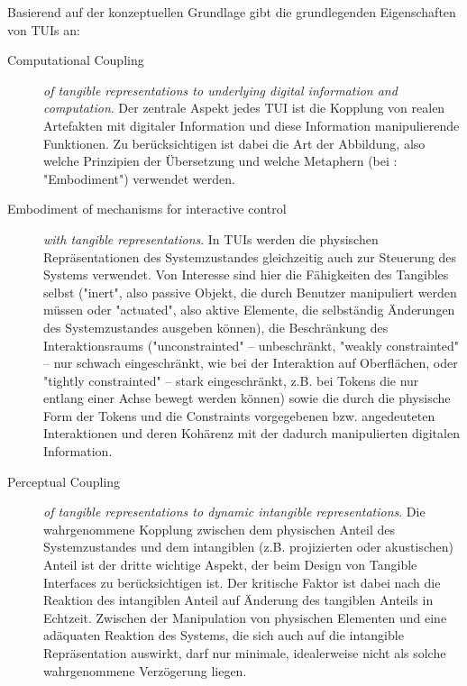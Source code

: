 Basierend auf der konzeptuellen Grundlage gibt \citeauthor{Ishii08} die grundlegenden Eigenschaften von \glspl{TUI} an:
\begin{description}
	\item[Computational Coupling] \emph{of tangible representations to underlying digital information and computation}. Der zentrale Aspekt jedes \gls{TUI} ist die Kopplung von realen Artefakten mit digitaler Information und diese Information manipulierende Funktionen. Zu berücksichtigen ist dabei die Art der Abbildung, also welche Prinzipien der Übersetzung und welche Metaphern (bei \citeauthor{Ishii08}: "Embodiment") verwendet werden.
	\item[Embodiment of mechanisms for interactive control] \emph{with tangible representations}. In \glspl{TUI} werden die physischen Repräsentationen des Systemzustandes gleichzeitig auch zur Steuerung des Systems verwendet. Von Interesse sind hier die Fähigkeiten des Tangibles selbst ("inert", also passive Objekt, die durch Benutzer manipuliert werden müssen oder "actuated", also aktive Elemente, die selbständig Änderungen des Systemzustandes ausgeben können), die Beschränkung des Interaktionsraums ("unconstrainted" -- unbeschränkt, "weakly constrainted" -- nur schwach eingeschränkt, wie bei der Interaktion auf Oberflächen, oder "tightly constrainted" -- stark eingeschränkt, z.B. bei Tokens die nur entlang einer Achse bewegt werden können) sowie die durch die physische Form der Tokens und die Constraints vorgegebenen bzw. angedeuteten Interaktionen und deren Kohärenz mit der dadurch manipulierten digitalen Information.
	\item[Perceptual Coupling] \emph{of tangible representations to dynamic intangible representations}. Die wahrgenommene Kopplung zwischen dem physischen Anteil des Systemzustandes und dem intangiblen (z.B. projizierten oder akustischen) Anteil ist der dritte wichtige Aspekt, der beim Design von Tangible Interfaces zu berücksichtigen ist. Der kritische Faktor ist dabei nach \citeauthor{Ishii08} die Reaktion des intangiblen Anteil auf Änderung des tangiblen Anteils in Echtzeit. Zwischen der Manipulation von physischen Elementen und eine adäquaten Reaktion des Systems, die sich auch auf die intangible Repräsentation auswirkt, darf nur minimale, idealerweise nicht als solche wahrgenommene Verzögerung liegen. 
\end{description}

